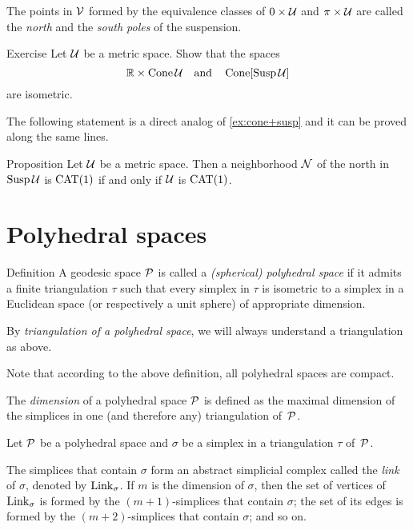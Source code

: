 The points in $\mathcal{V}$ formed by the equivalence classes of $0\times\mathcal{U}$ and $\pi\times\mathcal{U}$ are called  the {}\emph{north} and the \emph{south poles} of the suspension.

\begin{thm}{Exercise}\label{ex:product-cone}
Let $\mathcal{U}$ be a metric space.
Show that the spaces 
\[\mathbb{R}\times \mathop{\rm Cone}\nolimits\mathcal{U}\quad\text{and}\quad\mathop{\rm Cone}\nolimits[\mathop{\rm Susp}\nolimits\mathcal{U}]\]
are  isometric.
\end{thm}

The following statement is a direct analog of \ref{ex:cone+susp} and it can be proved along the same lines.

\begin{thm}{Proposition}\label{prop:susp}
Let $\mathcal{U}$ be a metric space.
Then a neighborhood $\mathcal{N}$ of the north in $\mathop{\rm Susp}\nolimits\mathcal{U}$ is  $\mathrm{CAT}(1)$ if and only if $\mathcal{U}$ is $\mathrm{CAT}(1)$.
\end{thm}

\section{Polyhedral spaces}

\begin{thm}{Definition}\label{def:poly}
A geodesic space $\mathcal{P}$ is called  
a \emph{(spherical) polyhedral space} 
if it admits a finite triangulation $\tau$ 
such that every simplex in $\tau$ is isometric to a simplex in a Euclidean space (or respectively a unit sphere) of appropriate dimension.

By \emph{triangulation of a polyhedral space}, 
we will always understand a triangulation as above. 
\end{thm}

Note that according to the above definition,
all polyhedral spaces are compact.

The \emph{dimension} of a polyhedral space $\mathcal{P}$
is defined as the maximal dimension of the simplices 
in one (and therefore any) triangulation of~$\mathcal{P}$.

Let $\mathcal{P}$ be a polyhedral space
and $\sigma$ be a simplex in a triangulation $\tau$ of~$\mathcal{P}$.

The simplices that  contain $\sigma$
form an abstract simplicial complex called the \emph{link} of $\sigma$, 
denoted by $\mathop{\rm Link}\nolimits_\sigma$.
If $m$ is  the dimension of $\sigma$,
then the set of vertices of $\mathop{\rm Link}\nolimits_\sigma$
is formed by the $(m+1)$-simplices that  contain $\sigma$;
the set of its edges is formed by the $(m+2)$-simplices 
that contain $\sigma$; and so on.

